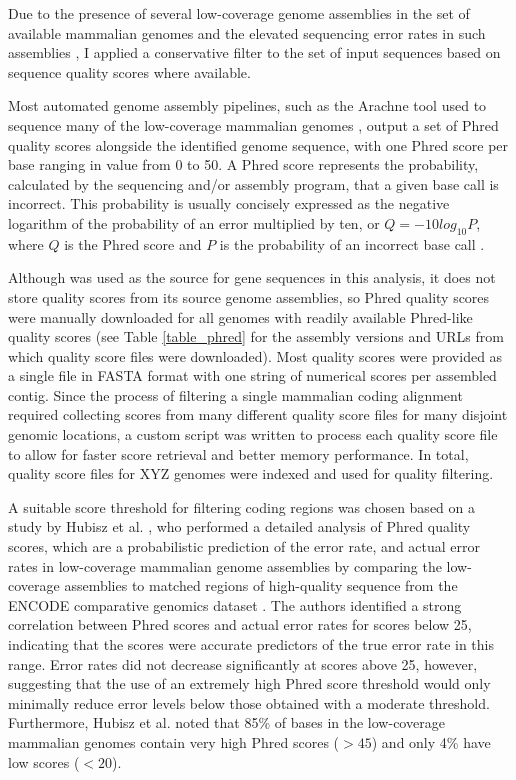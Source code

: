 Due to the presence of several low-coverage genome assemblies in the
set of available mammalian genomes and the elevated sequencing error
rates in such assemblies \citep{Hubbard2007}, I applied a conservative
filter to the set of input sequences based on sequence quality scores
where available.

Most automated genome assembly pipelines, such as the Arachne tool
used to sequence many of the low-coverage mammalian genomes
\citep{Jaffe2003}, output a set of Phred quality scores alongside the
identified genome sequence, with one Phred score per base ranging in
value from 0 to 50. A Phred score represents the probability,
calculated by the sequencing and/or assembly program, that a given
base call is incorrect. This probability is usually concisely
expressed as the negative logarithm of the probability of an error
multiplied by ten, or $Q=-10log_{10}P$, where $Q$ is the Phred score
and $P$ is the probability of an incorrect base call \citep{Cock2010}.

Although \ens was used as the source for gene sequences in this
analysis, it does not store quality scores from its source genome
assemblies, so Phred quality scores were manually downloaded for all
genomes with readily available Phred-like quality scores (see Table
\ref{table_phred} for the assembly versions and URLs from which
quality score files were downloaded). Most quality scores were
provided as a single file in FASTA format with one string of numerical
scores per assembled contig. Since the process of filtering a single
mammalian coding alignment required collecting scores from many
different quality score files for many disjoint genomic locations, a
custom script was written to process each quality score file to allow
for faster score retrieval and better memory performance. In total,
quality score files for XYZ genomes were indexed and used for quality
filtering.

A suitable score threshold for filtering coding regions was chosen
based on a study by Hubisz et al. \citeyearpar{Hubisz2011}, who
performed a detailed analysis of Phred quality scores, which are a
probabilistic prediction of the error rate, and actual error rates in
low-coverage mammalian genome assemblies by comparing the low-coverage
assemblies to matched regions of high-quality sequence from the ENCODE
comparative genomics dataset
\citep{ENCODE_Project_Consortium2007a}. The authors identified a
strong correlation between Phred scores and actual error rates for
scores below 25, indicating that the scores were accurate predictors
of the true error rate in this range. Error rates did not decrease
significantly at scores above 25, however, suggesting that the use of
an extremely high Phred score threshold would only minimally reduce
error levels below those obtained with a moderate
threshold. Furthermore, Hubisz et al. noted that 85\% of bases in the
low-coverage mammalian genomes contain very high Phred scores ($>45$)
and only 4\% have low scores ($<20$).

